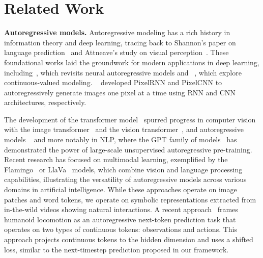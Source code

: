 \section{Related Work}










\textbf{Autoregressive models.} Autoregressive modeling has a rich history in information theory and deep learning, tracing back to Shannon's paper on language prediction~\citep{shannon1951prediction} and Attneave's study on visual perception~\citep{attneave1954some}. These foundational works laid the groundwork for modern applications in deep learning, including~\citep{larochelle2011neural}, which revisits neural autoregressive models and ~\citep{gregor2014deep, theis2015generative}, which explore continuous-valued modeling. ~\citep{van2016pixel} developed PixelRNN and PixelCNN to autoregressively generate images one pixel at a time using RNN and CNN architectures, respectively. 

\medskip
The development of the transformer model~\citep{vaswani2017attention} spurred progress in computer vision with the image transformer~\citep{parmar2018imagetransformer} and the vision transformer~\citep{dosovitskiy2020image}, and autoregressive models ~\cite{chen2020generative, rajasegaran2025empirical} and more notably in NLP, where the GPT family of models~\citep{radford2018improving, radford2019language, brown2020language} has demonstrated the power of large-scale unsupervised autoregressive pre-training. Recent research has focused on multimodal learning, exemplified by the Flamingo~\citep{alayrac2022flamingo} or LlaVa~\citep{liu2023improved} models, which combine vision and language processing capabilities, illustrating the versatility of autoregressive models across various domains in artificial intelligence. While these approaches operate on image patches and word tokens, we operate on symbolic representations extracted from in-the-wild videos showing natural interactions.  A recent approach~\citep{radosavovic2024humanoid} frames humanoid locomotion as an autoregressive next-token prediction task that operates on two types of continuous tokens: observations and actions. This approach projects continuous tokens to the hidden dimension and uses a shifted loss, similar to the next-timestep prediction proposed in our framework.


